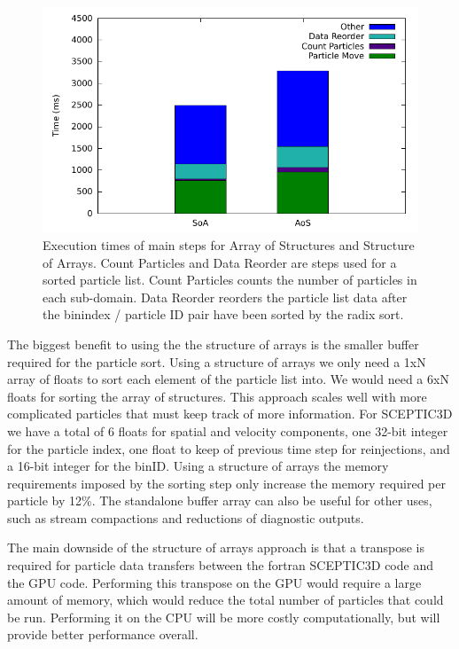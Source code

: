 \begin{figure}[h]
\begin{center}
\includegraphics[width=5in]{design/soa_vs_aos.pdf}
\end{center}
\caption[Particle List Structure Comparison]{Execution times of main steps for Array of Structures and Structure of Arrays. Count Particles and Data Reorder are steps used for a sorted particle list. Count Particles counts the number of particles in each sub-domain. Data Reorder reorders the particle list data after the binindex / particle ID pair have been sorted by the radix sort.}
\label{fig:struct_compare} 
\end{figure}



The biggest benefit to using the the structure of arrays is the smaller buffer required for the particle sort. Using a structure of arrays we only need a 1xN array of floats to sort each element of the particle list into. We would need a 6xN floats for sorting the array of structures. This approach scales well with more complicated particles that must keep track of more information. For SCEPTIC3D we have a total of 6 floats for spatial and velocity components, one 32-bit integer for the particle index, one float to keep of previous time step for reinjections, and a 16-bit integer for the binID. Using a structure of arrays the memory requirements imposed by the sorting step only increase the memory required per particle by 12\%. The standalone buffer array can also be useful for other uses, such as stream compactions and reductions of diagnostic outputs. 

The main downside of the structure of arrays approach is that a transpose is required for particle data transfers between the fortran SCEPTIC3D code and the GPU code. Performing this transpose on the GPU would require a large amount of memory, which would reduce the total number of particles that could be run. Performing it on the CPU will be more costly computationally, but will provide better performance overall.  




